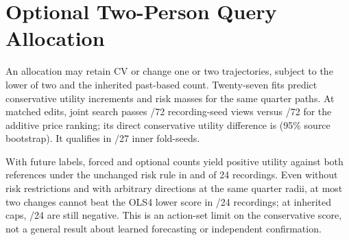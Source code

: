 \section{Optional Two-Person Query Allocation}
An allocation may retain CV or change one or two trajectories, subject
to the lower of two and the inherited past-based count. Twenty-seven
fits predict conservative utility increments and risk masses for the
same quarter paths. At \OptionalAllocationEdits{} matched edits,
joint search passes \OptionalAllocationJoint/72 recording-seed views
versus \OptionalAllocationPriced/72 for the additive price ranking;
its direct conservative utility difference is \OptionalAllocationEffect{}
(95\% source bootstrap). It qualifies in \OptionalAllocationQualified/27
inner fold-seeds.

With future labels, forced and optional counts yield positive utility
against both references under the unchanged risk rule in
\OptionalAllocationForced{} and \OptionalAllocationOptional{} of 24 recordings.
Even without risk restrictions and with arbitrary directions at the
same quarter radii, at most two changes cannot beat the OLS4 lower
score in \OptionalAllocationNoTwo/24 recordings; at inherited caps,
\OptionalAllocationNoInherited/24 are still negative. This is an
action-set limit on the conservative score, not a general result
about learned forecasting or independent confirmation.
